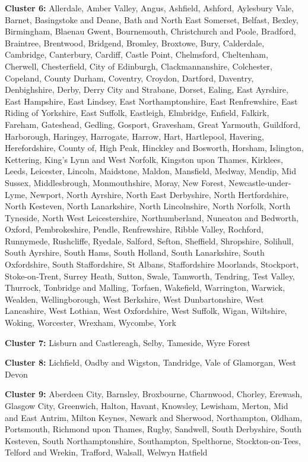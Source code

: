\documentclass[Royal,times,sageh]{sagej}
\begin{document}
\textbf{Cluster 6: } Allerdale, Amber Valley, Angus, Ashfield, Ashford,
Aylesbury Vale, Barnet, Basingstoke and Deane, Bath and North East
Somerset, Belfast, Bexley, Birmingham, Blaenau Gwent, Bournemouth,
Christchurch and Poole, Bradford, Braintree, Brentwood, Bridgend,
Bromley, Broxtowe, Bury, Calderdale, Cambridge, Canterbury, Cardiff,
Castle Point, Chelmsford, Cheltenham, Cherwell, Chesterfield, City of
Edinburgh, Clackmannanshire, Colchester, Copeland, County Durham,
Coventry, Croydon, Dartford, Daventry, Denbighshire, Derby, Derry City
and Strabane, Dorset, Ealing, East Ayrshire, East Hampshire, East
Lindsey, East Northamptonshire, East Renfrewshire, East Riding of
Yorkshire, East Suffolk, Eastleigh, Elmbridge, Enfield, Falkirk,
Fareham, Gateshead, Gedling, Gosport, Gravesham, Great Yarmouth,
Guildford, Harborough, Haringey, Harrogate, Harrow, Hart, Hartlepool,
Havering, Herefordshire, County of, High Peak, Hinckley and Bosworth,
Horsham, Islington, Kettering, King's Lynn and West Norfolk, Kingston
upon Thames, Kirklees, Leeds, Leicester, Lincoln, Maidstone, Maldon,
Mansfield, Medway, Mendip, Mid Sussex, Middlesbrough, Monmouthshire,
Moray, New Forest, Newcastle-under-Lyme, Newport, North Ayrshire, North
East Derbyshire, North Hertfordshire, North Kesteven, North Lanarkshire,
North Lincolnshire, North Norfolk, North Tyneside, North West
Leicestershire, Northumberland, Nuneaton and Bedworth, Oxford,
Pembrokeshire, Pendle, Renfrewshire, Ribble Valley, Rochford, Runnymede,
Rushcliffe, Ryedale, Salford, Sefton, Sheffield, Shropshire, Solihull,
South Ayrshire, South Hams, South Holland, South Lanarkshire, South
Oxfordshire, South Staffordshire, St Albans, Staffordshire Moorlands,
Stockport, Stoke-on-Trent, Surrey Heath, Sutton, Swale, Tamworth,
Tendring, Test Valley, Thurrock, Tonbridge and Malling, Torfaen,
Wakefield, Warrington, Warwick, Wealden, Wellingborough, West Berkshire,
West Dunbartonshire, West Lancashire, West Lothian, West Oxfordshire,
West Suffolk, Wigan, Wiltshire, Woking, Worcester, Wrexham, Wycombe,
York

\textbf{Cluster 7: } Lisburn and Castlereagh, Selby, Tameside, Wyre
Forest

\textbf{Cluster 8: } Lichfield, Oadby and Wigston, Tandridge, Vale of
Glamorgan, West Devon

\textbf{Cluster 9: } Aberdeen City, Barnsley, Broxbourne, Charnwood,
Chorley, Erewash, Glasgow City, Greenwich, Halton, Havant, Knowsley,
Lewisham, Merton, Mid and East Antrim, Milton Keynes, Newark and
Sherwood, Northampton, Oldham, Portsmouth, Richmond upon Thames, Rugby,
Sandwell, South Derbyshire, South Kesteven, South Northamptonshire,
Southampton, Spelthorne, Stockton-on-Tees, Telford and Wrekin, Trafford,
Walsall, Welwyn Hatfield
\end{document}
